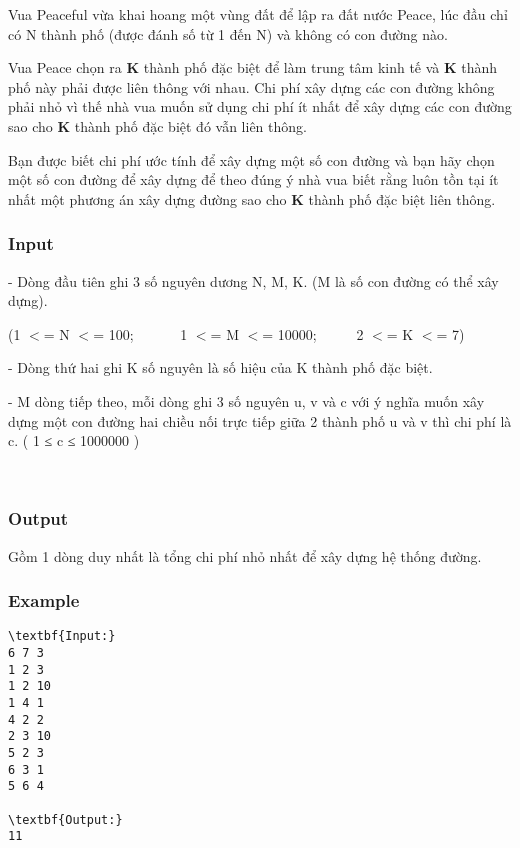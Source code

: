 

Vua Peaceful vừa khai hoang một vùng đất để lập ra đất nước Peace, lúc đầu chỉ có N thành phố (được đánh số từ 1 đến N) và không có con đường nào.

Vua Peace chọn ra \textbf{ K } thành phố đặc biệt để làm trung tâm kinh tế và \textbf{ K } thành phố này phải được liên thông với nhau. Chi phí xây dựng các con đường không phải nhỏ vì thế nhà vua muốn sử dụng chi phí ít nhất để xây dựng các con đường sao cho \textbf{ K } thành phố đặc biệt đó vẫn liên thông.

Bạn được biết chi phí ước tính để xây dựng một số con đường và bạn hãy chọn một số con đường để xây dựng để theo đúng ý nhà vua biết rằng luôn tồn tại ít nhất một phương án xây dựng đường sao cho \textbf{ K } thành phố đặc biệt liên thông.

\subsubsection{Input}

- Dòng đầu tiên ghi 3 số nguyên dương N, M, K. (M là số con đường có thể xây dựng).

(1 $<$= N $<$= 100;       1 $<$= M $<$= 10000;      2 $<$= K $<$= 7)

- Dòng thứ hai ghi K số nguyên là số hiệu của K thành phố đặc biệt.

- M dòng tiếp theo, mỗi dòng ghi 3 số nguyên u, v và c với ý nghĩa muốn xây dựng một con đường hai chiều nối trực tiếp giữa 2 thành phố u và v thì chi phí là c. ( 1 ≤ c ≤ 1000000 )

 

\subsubsection{Output}

Gồm 1 dòng duy nhất là tổng chi phí nhỏ nhất để xây dựng hệ thống đường.

\subsubsection{Example}
\begin{verbatim}
\textbf{Input:}
6 7 3
1 2 3
1 2 10
1 4 1
4 2 2
2 3 10
5 2 3
6 3 1
5 6 4

\textbf{Output:}
11

\end{verbatim}
